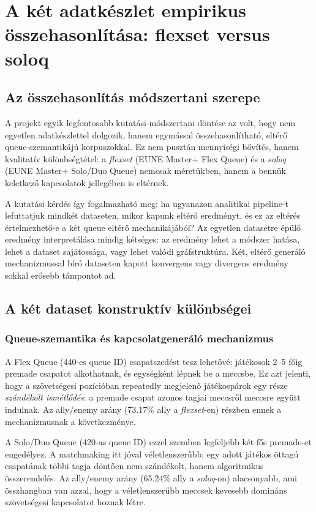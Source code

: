 \chapter{A két adatkészlet empirikus összehasonlítása: flexset versus soloq}

\section{Az összehasonlítás módszertani szerepe}

A projekt egyik legfontosabb kutatási-módszertani döntése az volt, hogy nem egyetlen adatkészlettel dolgozik, hanem egymással összehasonlítható, eltérő queue-szemantikájú korpuszokkal. Ez nem pusztán mennyiségi bővítés, hanem kvalitatív különbségtétel: a \textit{flexset} (EUNE Master$+$ Flex Queue) és a \textit{soloq} (EUNE Master$+$ Solo/Duo Queue) nemcsak méretükben, hanem a bennük keletkező kapcsolatok jellegében is eltérnek.

A kutatási kérdés így fogalmazható meg: ha ugyanazon analitikai pipeline-t lefuttatjuk mindkét dataseten, mikor kapunk eltérő eredményt, és ez az eltérés értelmezhető-e a két queue eltérő mechanikájából? Az egyetlen datasetre épülő eredmény interpretálása mindig kétséges: az eredmény lehet a módszer hatása, lehet a dataset sajátossága, vagy lehet valódi gráfstruktúra. Két, eltérő generáló mechanizmussal bíró dataseten kapott konvergens vagy divergens eredmény sokkal erősebb támpontot ad.

\section{A két dataset konstruktív különbségei}

\subsection{Queue-szemantika és kapcsolatgeneráló mechanizmus}

A Flex Queue (440-es queue ID) csapatszedést tesz lehetővé: játékosok 2--5 főig premade csapatot alkothatnak, és egységként lépnek be a meccsbe. Ez azt jelenti, hogy a szövetségesi pozícióban repeatedly megjelenő játékospárok egy része \emph{szándékolt ismétlődés}: a premade csapat azonos tagjai meccsről meccsre együtt indulnak. Az ally/enemy arány (73.17\% ally a \textit{flexset}-en) részben ennek a mechanizmusnak a következménye.

A Solo/Duo Queue (420-as queue ID) ezzel szemben legfeljebb két fős premade-et engedélyez. A matchmaking itt jóval véletlenszerűbb: egy adott játékos öttagú csapatának többi tagja döntően nem szándékolt, hanem algoritmikus összerendelés. Az ally/enemy arány (65.24\% ally a \textit{soloq}-on) alacsonyabb, ami összhangban van azzal, hogy a véletlenszerűbb meccsek kevesebb domináns szövetségesi kapcsolatot hoznak létre.

